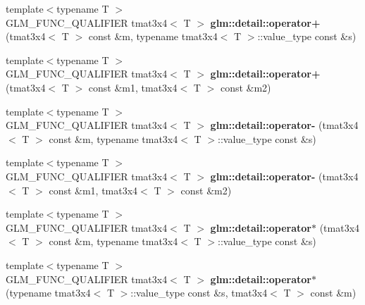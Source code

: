 \begin{DoxyCompactItemize}
\item 
\hypertarget{namespaceglm_1_1detail_ad21ec2679ffe6fd20a06c4a531a81a3f}{{\footnotesize template$<$typename T $>$ }\\G\-L\-M\-\_\-\-F\-U\-N\-C\-\_\-\-Q\-U\-A\-L\-I\-F\-I\-E\-R tmat3x4$<$ T $>$ {\bfseries glm\-::detail\-::operator+} (tmat3x4$<$ T $>$ const \&m, typename tmat3x4$<$ T $>$\-::value\-\_\-type const \&s)}\label{namespaceglm_1_1detail_ad21ec2679ffe6fd20a06c4a531a81a3f}

\item 
\hypertarget{namespaceglm_1_1detail_a3fe444d69a916029a82b3c88cff769d5}{{\footnotesize template$<$typename T $>$ }\\G\-L\-M\-\_\-\-F\-U\-N\-C\-\_\-\-Q\-U\-A\-L\-I\-F\-I\-E\-R tmat3x4$<$ T $>$ {\bfseries glm\-::detail\-::operator+} (tmat3x4$<$ T $>$ const \&m1, tmat3x4$<$ T $>$ const \&m2)}\label{namespaceglm_1_1detail_a3fe444d69a916029a82b3c88cff769d5}

\item 
\hypertarget{namespaceglm_1_1detail_a200fdfe1f727d2a5fc9c537386dc12dd}{{\footnotesize template$<$typename T $>$ }\\G\-L\-M\-\_\-\-F\-U\-N\-C\-\_\-\-Q\-U\-A\-L\-I\-F\-I\-E\-R tmat3x4$<$ T $>$ {\bfseries glm\-::detail\-::operator-\/} (tmat3x4$<$ T $>$ const \&m, typename tmat3x4$<$ T $>$\-::value\-\_\-type const \&s)}\label{namespaceglm_1_1detail_a200fdfe1f727d2a5fc9c537386dc12dd}

\item 
\hypertarget{namespaceglm_1_1detail_a014793033303e75d1a27de59a47dcb1d}{{\footnotesize template$<$typename T $>$ }\\G\-L\-M\-\_\-\-F\-U\-N\-C\-\_\-\-Q\-U\-A\-L\-I\-F\-I\-E\-R tmat3x4$<$ T $>$ {\bfseries glm\-::detail\-::operator-\/} (tmat3x4$<$ T $>$ const \&m1, tmat3x4$<$ T $>$ const \&m2)}\label{namespaceglm_1_1detail_a014793033303e75d1a27de59a47dcb1d}

\item 
\hypertarget{namespaceglm_1_1detail_a6488c5b53957561f308cf265e0e2d1ae}{{\footnotesize template$<$typename T $>$ }\\G\-L\-M\-\_\-\-F\-U\-N\-C\-\_\-\-Q\-U\-A\-L\-I\-F\-I\-E\-R tmat3x4$<$ T $>$ {\bfseries glm\-::detail\-::operator$\ast$} (tmat3x4$<$ T $>$ const \&m, typename tmat3x4$<$ T $>$\-::value\-\_\-type const \&s)}\label{namespaceglm_1_1detail_a6488c5b53957561f308cf265e0e2d1ae}

\item 
\hypertarget{namespaceglm_1_1detail_a2da3fc1f61414061b598db537dd685fc}{{\footnotesize template$<$typename T $>$ }\\G\-L\-M\-\_\-\-F\-U\-N\-C\-\_\-\-Q\-U\-A\-L\-I\-F\-I\-E\-R tmat3x4$<$ T $>$ {\bfseries glm\-::detail\-::operator$\ast$} (typename tmat3x4$<$ T $>$\-::value\-\_\-type const \&s, tmat3x4$<$ T $>$ const \&m)}\label{namespaceglm_1_1detail_a2da3fc1f61414061b598db537dd685fc}


\end{DoxyCompactItemize}
